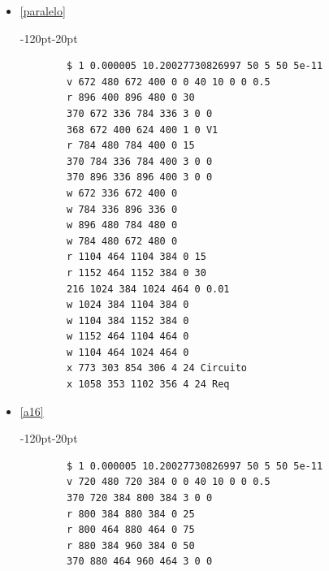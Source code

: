 \documentclass{article}
\begin{document}
\begin{itemize}
\begin{adjustwidth}{-120pt}{-20pt}
\begin{lstlisting}
		v 816 464 816 384 0 0 40 100 0 0 0.5
		r 928 384 928 464 0 75
		370 816 384 816 320 3 0 0
		w 928 464 816 464 0
		368 816 384 768 384 1 0 V1
		r 928 384 928 320 0 25
		w 816 320 928 320 0
		p 976 320 976 384 3 0 0 10000000
		p 976 384 976 464 3 0 0 10000000
		w 976 320 928 320 0
		w 976 384 928 384 0
		w 976 464 928 464 0
	\end{lstlisting}
\end{adjustwidth}
\clearpage
	\item \href{https://www.falstad.com/circuit/circuitjs.html?ctz=CQAgjCAMB0l3BWcMBMcUHYMGZIA4UA2ATmIxAUgoqoQFMBaMMAKADcRCMUQAWPKlx684UMSORiqMBCwBOIPMUJ9RSlf2khcLbBkHdt2FRjy8jK7FN2E8nQyMEpzj8GIBqrBaZcCQP1S0wWT0qAOxjfzNA7WtQxWULBI1RK2kWAHd7HgiVIRjITKjzXOSkwqz1Pj8AzSgi2r98usKFZkgXQnN2kuiqYPlwYOEuoYQcvu1ClDAVMEhnbWj5xd5R6VhWLJXe7vnd+u39pb3xk8Oxkb2OvnWintvuhc7zQoAPfxwpqzwEEsgNCBFgBhACWcgAxgBXUEAFwA9iwPvMEHZsAgrO0cghAYsAEp0ACOLCAA}{\ref{paralelo}}  \\
\begin{adjustwidth}{-120pt}{-20pt}
	\begin{lstlisting}
		$ 1 0.000005 10.20027730826997 50 5 50 5e-11
		v 672 480 672 400 0 0 40 10 0 0 0.5
		r 896 400 896 480 0 30
		370 672 336 784 336 3 0 0
		368 672 400 624 400 1 0 V1
		r 784 480 784 400 0 15
		370 784 336 784 400 3 0 0
		370 896 336 896 400 3 0 0
		w 672 336 672 400 0
		w 784 336 896 336 0
		w 896 480 784 480 0
		w 784 480 672 480 0
		r 1104 464 1104 384 0 15
		r 1152 464 1152 384 0 30
		216 1024 384 1024 464 0 0.01
		w 1024 384 1104 384 0
		w 1104 384 1152 384 0
		w 1152 464 1104 464 0
		w 1104 464 1024 464 0
		x 773 303 854 306 4 24 Circuito
		x 1058 353 1102 356 4 24 Req	
	\end{lstlisting}
\end{adjustwidth}
	\item \href{https://www.falstad.com/circuit/circuitjs.html?ctz=CQAgjCAMB0l3BWcMBMcUHYMGZIA4UA2ATmIxAUgoqoQFMBaMMAKADcQM0QAWPKrlWx4eUMTypgq0qNAQtsGAd2Gj+QkSGxjILAE4h1WzXn7HRVFPINGehNWbsXO1w2dUhihDc8oKlblROnt689lo6-lRePsgS5hHSCoR4gVrYhGm4ohBUAGoAhsmpggmEXAm5IHmsAO5ZGVmauvW24UYeLSFB4VLxwV19PTmQ8Z0s9UOVkAiZ45Mzc5pSs7xeUBPIqzzrpTuZXXu73HxJQA}{\ref{a16}} \\
\begin{adjustwidth}{-120pt}{-20pt}
	\begin{lstlisting}
		$ 1 0.000005 10.20027730826997 50 5 50 5e-11
		v 720 480 720 384 0 0 40 10 0 0 0.5
		370 720 384 800 384 3 0 0
		r 800 384 880 384 0 25
		r 800 464 880 464 0 75
		r 880 384 960 384 0 50
		370 880 464 960 464 3 0 0

\end{lstlisting}
\end{adjustwidth}
\end{itemize}
\end{document}
